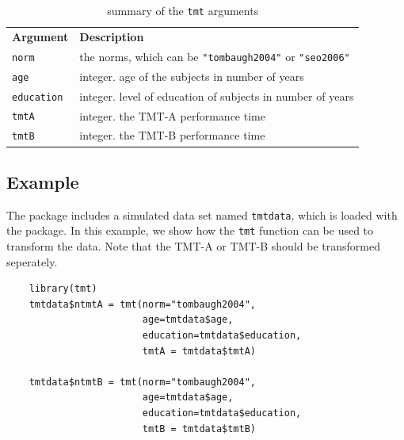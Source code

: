 \documentclass[]{article}
\begin{document}
\begin{table}[H]
	\caption{summary of the \texttt{tmt} arguments}
	\begin{tabular}{ll}
		\textbf{Argument} & \textbf{Description}                                                                                                                             \\
		\texttt{norm}              & the norms, which can be \texttt{"tombaugh2004"} or \texttt{"seo2006"} \\
		\texttt{age}               & integer. age of the subjects in number of years                                                                                                  \\
		\texttt{education}         & integer. level of education of subjects in number of years                                                                                       \\
		\texttt{tmtA}              & integer. the TMT-A performance time                                                                                                              \\
		\texttt{tmtB}              & integer. the TMT-B performance time                                                                                                             
	\end{tabular}
\end{table}



\subsection{Example}

The package includes a simulated data set named \texttt{tmtdata}, which is loaded with the package. In this example, we show how the \texttt{tmt} function can be used to transform the data. Note that the TMT-A or TMT-B should be transformed seperately. 

\begin{verbatim}
    library(tmt)
    tmtdata$ntmtA = tmt(norm="tombaugh2004", 
                        age=tmtdata$age, 
                        education=tmtdata$education,
                        tmtA = tmtdata$tmtA)
                    
    tmtdata$ntmtB = tmt(norm="tombaugh2004", 
                        age=tmtdata$age, 
                        education=tmtdata$education,
                        tmtB = tmtdata$tmtB)
\end{verbatim}
\end{document}
